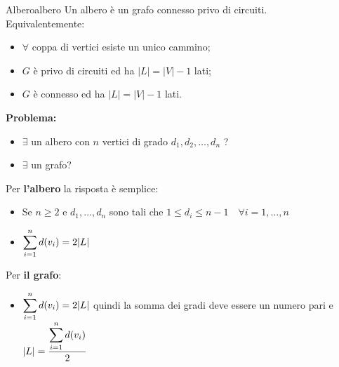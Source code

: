 \documentclass[12pt, letterpaper]{report}
\newcounter{definition}
\newcommand{\nmu}{}
\begin{document}
    \begin{definition}{\nmu Albero}{albero}
    	Un albero è un grafo connesso privo di circuiti. \\
    	Equivalentemente:
    	\begin{itemize}
    		\item $\forall$ coppa di vertici esiste un unico cammino;
    		\item $G$ è privo di circuiti ed ha $|L| = |V| - 1$ lati;
    		\item $G$ è connesso ed ha $|L| = |V| - 1$ lati.
    	\end{itemize}
    \end{definition}
    \textbf{Problema:}
    \begin{itemize}
    	\item $\exists$ un albero con $n$ vertici di grado $d_1, d_2, \dots, d_n$ ?    	\item $\exists$ un grafo?
    \end{itemize}
    Per \textbf{l'albero} la risposta è semplice:
    \begin{itemize}
    	\item Se $n \geq 2$ e $d_1, \dots, d_n$ sono tali che $1 \leq d_i \leq n - 1 \quad \forall i = 1, \dots, n$
    	\item $\mathlarger{\sum_{i=1}^{n}d(v_i) = 2|L|}$
    \end{itemize}
    Per \textbf{il grafo}:
    \begin{itemize}
    	\item $\mathlarger{\sum_{i=1}^{n}d(v_i) = 2|L|}$ quindi la somma dei gradi deve essere un numero pari e $|L| = \dfrac{\mathlarger{\sum_{i=1}^{n}d(v_i)}}{2}$
    \end{itemize}
\end{document}
